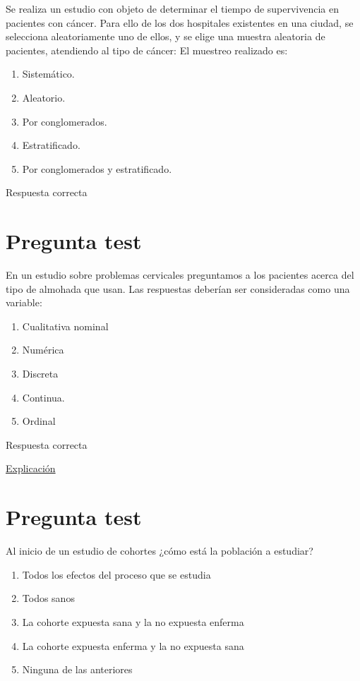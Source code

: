 \documentclass[
]{book}
\providecommand{\tightlist}{%
  \setlength{\itemsep}{0pt}\setlength{\parskip}{0pt}}
\begin{document}
Se realiza un estudio con objeto de determinar el tiempo de supervivencia en pacientes con cáncer. Para ello de los dos hospitales existentes en una ciudad, se selecciona aleatoriamente uno de ellos, y se elige una muestra aleatoria de pacientes, atendiendo al tipo de cáncer: El muestreo realizado es:

\begin{enumerate}
\def\labelenumi{\alph{enumi})}
\tightlist
\item
  Sistemático.
\item
  Aleatorio.
\item
  Por conglomerados.
\item
  Estratificado.
\item
  Por conglomerados y estratificado.
\end{enumerate}

Respuesta correcta

\hypertarget{pregunta-test-10}{%
\section{Pregunta test}\label{pregunta-test-10}}

En un estudio sobre problemas cervicales preguntamos a los pacientes acerca del tipo de almohada que usan. Las respuestas deberían ser consideradas como una variable:

\begin{enumerate}
\def\labelenumi{\alph{enumi})}
\tightlist
\item
  Cualitativa nominal
\item
  Numérica
\item
  Discreta
\item
  Continua.
\item
  Ordinal
\end{enumerate}

Respuesta correcta

\href{https://1fjmanzano.github.io/bioestadistica/tipos-de-variables.html}{Explicación}

\hypertarget{pregunta-test-11}{%
\section{Pregunta test}\label{pregunta-test-11}}

Al inicio de un estudio de cohortes ¿cómo está la población a estudiar?

\begin{enumerate}
\def\labelenumi{\alph{enumi})}
\tightlist
\item
  Todos los efectos del proceso que se estudia
\item
  Todos sanos
\item
  La cohorte expuesta sana y la no expuesta enferma
\item
  La cohorte expuesta enferma y la no expuesta sana
\item
  Ninguna de las anteriores
\end{enumerate}
\end{document}
